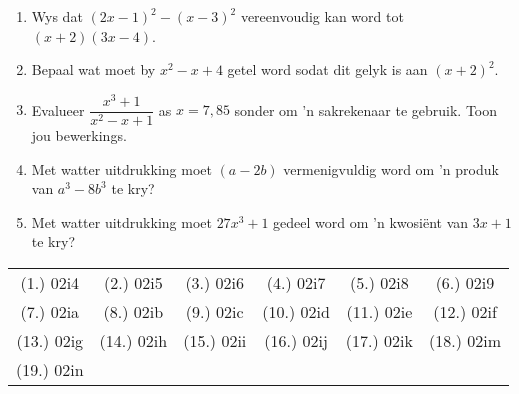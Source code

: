 \begin{eocexercises}{}
\begin{enumerate}[itemsep=5pt, label=\textbf{\arabic*}. ]
\item Wys dat ${(2x-1)}^{2}-{(x-3)}^{2}$ vereenvoudig kan word tot  $(x+2)(3x-4)$.

\item Bepaal wat moet by ${x}^{2}-x+4$ getel word sodat dit gelyk is aan ${(x+2)}^{2}$.
\item Evalueer $\dfrac{x^{3}+1}{x^{2}-x+1}$ as $x=7,85$ sonder om 'n sakrekenaar te gebruik. Toon jou bewerkings.
\item Met watter uitdrukking moet $(a-2b)$ vermenigvuldig word om 'n produk van $a^3-8b^3$ te kry?
\item Met watter uitdrukking moet $27x^3+1$ gedeel word om 'n kwosi\"ent van $3x+1$ te kry?
\end{enumerate}


\par \practiceinfo
\par \begin{tabular}[h]{cccccc}
(1.)	02i4	&
(2.)	02i5	&
(3.)	02i6	&
(4.)	02i7	&
(5.)	02i8	&
(6.)	02i9	\\ %
(7.)	02ia	&
(8.)	02ib	&
(9.)	02ic	&
(10.)	02id	&
(11.)	02ie	&
(12.)	02if	\\ %
(13.)	02ig	&
(14.)	02ih	&
(15.)	02ii	&
(16.)	02ij	&
(17.)	02ik	&
(18.)	02im	\\ %
(19.)	02in	&
\end{tabular}

\end{eocexercises}
